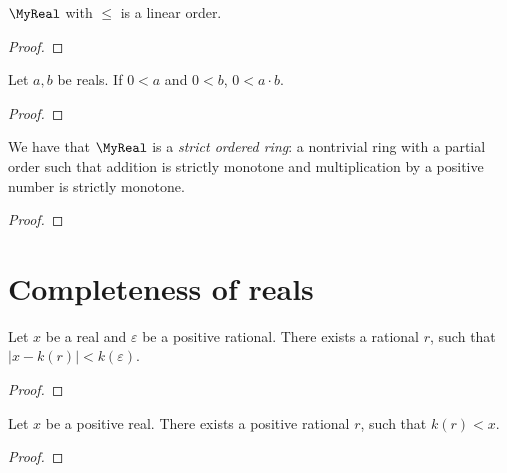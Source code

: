\begin{proposition}
    \leanok
    $\MyReal$ with $\leq$ is a linear order.
\end{proposition}
\begin{proof}
    \leanok
\end{proof}

\begin{lemma}
    \leanok
    Let $a,b$ be reals.
    If $0 < a$ and $0 < b$, $0 < a \cdot b$.
\end{lemma}
\begin{proof}
    \leanok
\end{proof}

\begin{proposition}
    \leanok
    We have that $\MyReal$ is a \emph{strict ordered ring}: a nontrivial ring with a partial order such that addition is strictly monotone and multiplication by a positive number is strictly monotone.
\end{proposition}
\begin{proof}
    \leanok
\end{proof}

\section{Completeness of reals}

\begin{lemma}
    \leanok
    Let $x$ be a real and $\varepsilon$ be a positive rational.
    There exists a rational $r$, such that $|x - k(r)| < k(\varepsilon)$.
\end{lemma}
\begin{proof}
    \leanok
\end{proof}

\begin{lemma}
    \leanok
    Let $x$ be a positive real.
    There exists a positive rational $r$, such that $k(r) < x$.
\end{lemma}
\begin{proof}
    \leanok
\end{proof}


